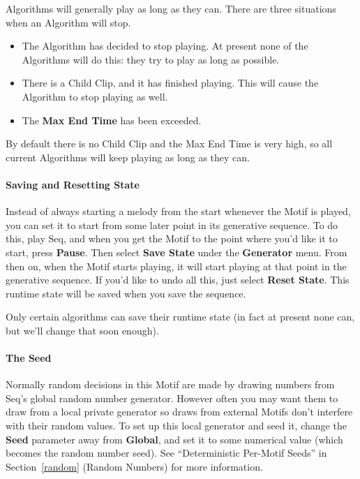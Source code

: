 \documentclass[twoside,10pt]{article}
\begin{document}
Algorithms will generally play as long as they can.  There are three situations when an Algorithm will stop.

\begin{itemize}
\item The Algorithm has decided to stop playing.  At present none of the Algorithms will do this: they try to play as long as possible.
\item There is a Child Clip, and it has finished playing.  This will cause the Algorithm to stop playing as well.
\item The {\bf Max End Time} has been exceeded.
\end{itemize}

By default there is no Child Clip and the Max End Time is very high, so all current Algorithms will keep playing as long as they can.

\paragraph{Saving and Resetting State}

Instead of always starting a melody from the start whenever the Motif is played, you can set it to start from some later point in its generative sequence.  To do this, play Seq, and when you get the Motif to the point where you'd like it to start, press {\bf Pause}.  Then select {\bf Save State} under the {\bf Generator} menu.  From then on, when the Motif starts playing, it will start playing at that point in the generative sequence.  If you'd like to undo all this, just select {\bf Reset State}.  This runtime state will be saved when you save the sequence.

Only certain algorithms can save their runtime state (in fact at present none can, but we'll change that soon enough).

\paragraph{The Seed}

Normally random decisions in this Motif are made by drawing numbers from Seq's global random number generator.  However often you may want them to draw from a local private generator so draws from external Motifs don't interfere with their random values.  To set up this local generator and seed it, change the {\bf Seed} parameter away from {\bf Global}, and set it to some numerical value (which becomes the random number seed).  See ``Deterministic Per-Motif Seeds'' in Section~\ref{random} (Random Numbers) for more information.
\end{document}
